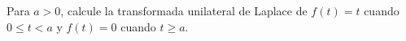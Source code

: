 Para $a>0$, calcule la transformada unilateral de Laplace de $f(t)=t$ cuando $0\le t<a$ y $f(t)=0$ cuando $t\ge a$.
